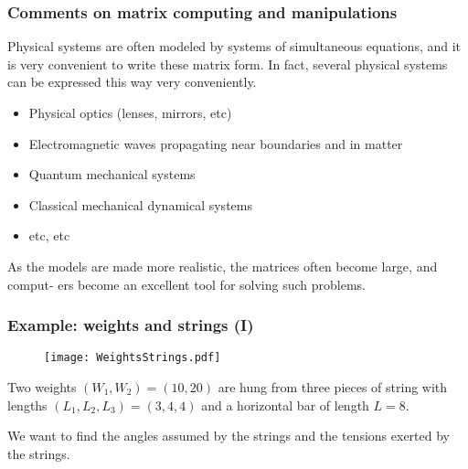 \documentclass[hyperref={colorlinks=true}]{beamer}
\begin{document}

\begin{frame}%
  \frametitle{Comments on matrix computing and manipulations}

  Physical systems are often modeled by systems of simultaneous equations, and it is very convenient to write these matrix form. In fact, several physical systems can be expressed this way very conveniently.
  
  \vspace{0.3cm}
  
  \begin{itemize}
    \item Physical optics (lenses, mirrors, etc)
    \item Electromagnetic waves propagating near boundaries and in matter
    \item Quantum mechanical systems
    \item Classical mechanical dynamical systems
    \item etc, etc
  \end{itemize}
  
  As the models are made more realistic, the matrices often become large, and comput- ers become an excellent tool for solving such problems.

\end{frame}


\begin{frame}%
  \frametitle{Example: weights and strings (I)}

  \begin{figure}
    \centering
    \texttt{[image: WeightsStrings.pdf]}
  \end{figure}
  
  Two weights $(W_1, W_2) = (10, 20)$ are hung from three pieces of string with lengths $(L_1, L_2, L_3) = (3, 4, 4)$ and a horizontal bar of length $L = 8$. 
  
  \mysp
  
  We want to find the angles assumed by the strings and the tensions exerted by the strings.
 
  
\end{frame}

\end{document}
